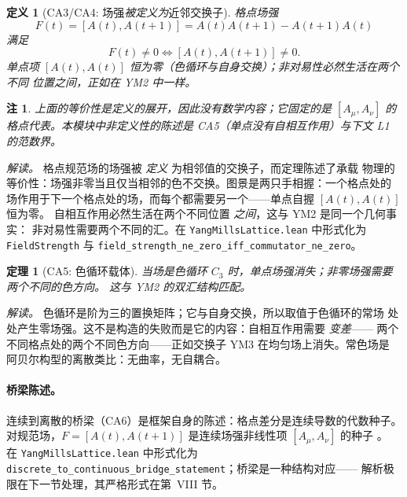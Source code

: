 \documentclass[aps,prd,preprint,superscriptaddress,amsmath,amssymb]{revtex4-2}
\newtheorem{theorem}{定理}[section]
\newtheorem{definition}{定义}[section]
\newtheorem{remark}{注}[section]
\begin{document}
\begin{definition}[CA3/CA4: 场强\emph{被定义为}近邻交换子]
\label{thm:ca3}
格点场强
\begin{equation}
F(t) = [A(t),A(t{+}1)] = A(t)A(t{+}1)-A(t{+}1)A(t)
\end{equation}
满足
\begin{equation}
F(t)\neq 0 \iff [A(t),A(t{+}1)]\neq 0 .
\end{equation}
单点项 $[A(t),A(t)]$ 恒为零（色循环与自身交换）；非对易性必然生活在两个不同
位置之间，正如在 YM2 中一样。
\end{definition}

\begin{remark}
上面的等价性是定义的展开，因此没有数学内容；它固定的是 $[A_\mu,A_\nu]$ 的格点代表。本模块中\emph{非}定义性的陈述是 CA5（单点没有自相互作用）与下文 L1 的范数界。
\end{remark}

\emph{解读。} 格点规范场的场强被 \emph{定义} 为相邻值的交换子，而定理陈述了承载
物理的等价性：场强非零当且仅当相邻的色不交换。图景是两只手相握：一个格点处的
场作用于下一个格点处的场，而每个都需要另一个——单点自握 $[A(t),A(t)]$ 恒为零。
自相互作用必然生活在两个不同位置 \emph{之间}，这与 YM2 是同一个几何事实：
非对易性需要两个不同的汇。在 \texttt{YangMillsLattice.lean} 中形式化为
\texttt{FieldStrength} 与 \texttt{field\_strength\_ne\_zero\_iff\_commutator\_ne\_zero}。

\begin{theorem}[CA5: 色循环载体]
\label{thm:ca5}
当场是色循环 $C_3$ 时，单点场强消失；非零场强需要两个不同的色方向。
这与 YM2 的双汇结构匹配。
\end{theorem}

\emph{解读。} 色循环是阶为三的置换矩阵；它与自身交换，所以取值于色循环的常场
处处产生零场强。这不是构造的失败而是它的内容：自相互作用需要 \emph{变差}——
两个不同格点处的两个不同色方向——正如交换子 YM3 在均匀场上消失。常色场是
阿贝尔构型的离散类比：无曲率，无自耦合。

\paragraph{桥梁陈述。}
连续到离散的桥梁（CA6）是框架自身的陈述：格点差分是连续导数的代数种子。
对规范场，$F=[A(t),A(t{+}1)]$ 是连续场强非线性项 $[A_\mu,A_\nu]$ 的种子
\cite{yang1954conservation,peskin1995introduction}。
在 \texttt{YangMillsLattice.lean} 中形式化为
\texttt{discrete\_to\_continuous\_bridge\_statement}；桥梁是一种结构对应——
解析极限在下一节处理，其严格形式在第~VIII 节。
\end{document}
